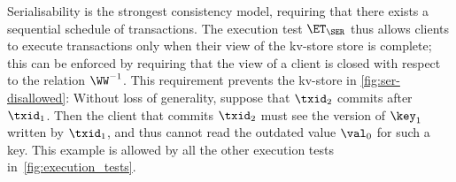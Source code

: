 
Serialisability is the strongest consistency model, requiring that there exists a sequential schedule of transactions. 
The execution test $\ET_{\SER}$ thus allows clients to execute transactions only when 
their view of the kv-store store is complete; this can be enforced by requiring that the view 
of a client is closed with respect to the relation $\WW^{-1}$.
This requirement prevents the kv-store in  \cref{fig:ser-disallowed}: 
Without loss of generality, suppose that $\txid_2$ commits after $\txid_1$. Then the  client that commits $\txid_2$ must see the version of $\key_1$ written by $\txid_1$, 
and thus cannot read the outdated value $\val_0$ for such a key. 
This example is allowed by all the other execution tests in~\cref{fig:execution_tests}.

